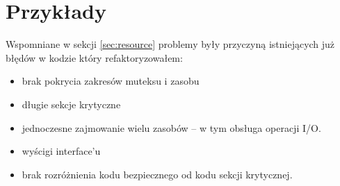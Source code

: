 \section{Przykłady}\label{sec:examples}
Wspomniane w sekcji \ref{sec:resource} problemy były przyczyną istniejących już błędów w kodzie który refaktoryzowałem:
\begin{itemize}
\item brak pokrycia zakresów muteksu i zasobu
\item długie sekcje krytyczne
\item jednoczesne zajmowanie wielu zasobów -- w tym obsługa operacji I/O.
\item wyścigi interface'u
\item brak rozróżnienia kodu bezpiecznego od kodu sekcji krytycznej.
\end{itemize}




